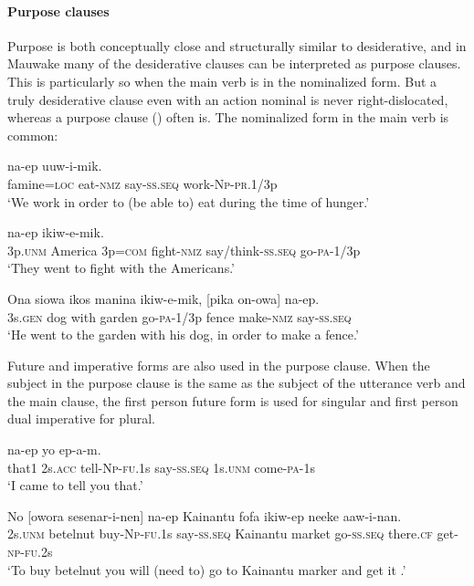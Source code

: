 \paragraph[Purpose clauses]{Purpose clauses}

Purpose is both conceptually close and structurally similar to desiderative, and in Mauwake many of the desiderative clauses can be interpreted as purpose clauses. This is particularly so when the main verb is in the nominalized form. But a truly desiderative clause even with an action nominal is never right-dislocated, whereas a purpose clause () often is. The nominalized form in the main verb is common:

\ea%
\label{ex:x371}
\gll [Weniwa=pa  en-owa]  na-ep  uuw-i-mik. \\
famine=\textsc{loc} eat-\textsc{nmz} say-\textsc{ss}.\textsc{seq} work-\textsc{Np}-\textsc{pr}.1/3p\\
\glt`We work in order to (be able to) eat during the time of hunger.'
\z


\ea%
\label{ex:x345}
\gll [Wi  Amerika  wiam=iya  irak-owa]  na-ep  ikiw-e-mik.\\
3p.\textsc{unm} America  3p=\textsc{com} fight-\textsc{nmz} say/think-\textsc{ss}.\textsc{seq} go-\textsc{pa}-1/3p\\
\glt`They went to fight with the Americans.'
\z


\ea%
\label{ex:x372}
\gll Ona  siowa  ikos  manina  ikiw-e-mik, [pika  on-owa] na-ep.\\
3s.\textsc{gen} dog  with  garden  go-\textsc{pa}-1/3p  fence  make-\textsc{nmz} say-\textsc{ss}.\textsc{seq}\\
\glt`He went to the garden with his dog, in order to make a fence.'
\z


Future and imperative forms are also used in the purpose clause. When the subject in the purpose clause is the same as the subject of the utterance verb and the main clause, the first person future form is used for singular and first person dual imperative for plural.

\ea%
\label{ex:x1614}
  na-ep  yo  ep-a-m.\\
that1 2s.\textsc{acc} tell-\textsc{Np}-\textsc{fu}.1s  say-\textsc{ss}.\textsc{seq} 1s.\textsc{unm} come-\textsc{pa}-1s\\
\glt`I came to tell you that.'
\z


\ea%
\label{ex:x1616}
\gll No  [owora  sesenar-i-nen]  na-ep  Kainantu  fofa ikiw-ep  neeke  aaw-i-nan.\\
2s.\textsc{unm} betelnut  buy-\textsc{Np}-\textsc{fu}.1s say-\textsc{ss}.\textsc{seq} Kainantu  market go-\textsc{ss}.\textsc{seq} there.\textsc{cf} get-\textsc{np}-\textsc{fu}.2s\\
\glt`To buy betelnut you will (need to) go to Kainantu marker and get it .'
\z


